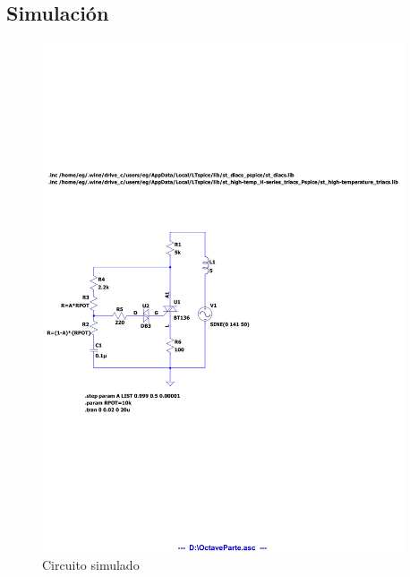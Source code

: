 \subsection{Simulación}
\begin{figure}[H]
 \begin{center}
   \includegraphics[width=0.95\textwidth, clip, trim=0 8cm 8cm 10cm]{inc/sim/OctavaParte.pdf}
 \end{center}
 \caption{Circuito simulado}\label{fig:}
\end{figure}

